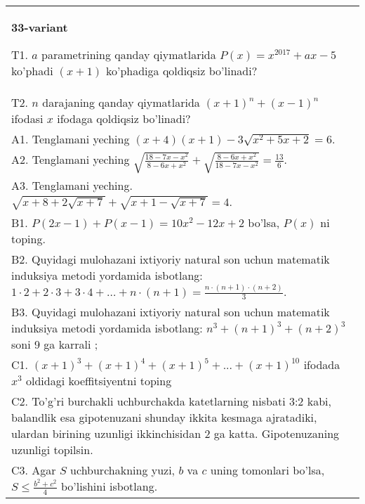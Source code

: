 \documentclass{article}
\begin{document}
\begin{tabular}{m{17cm}}
\textbf{33-variant}
\newline

T1. \(a\) parametrining qanday qiymatlarida \(P(x) = x^{2017} + ax - 5\) ko'phadi \((x + 1)\) ko'phadiga qoldiqsiz bo'linadi? \\
T2. \(n\) darajaning qanday qiymatlarida \((x + 1)^{n} + (x - 1)^{n}\) ifodasi \(x\) ifodaga qoldiqsiz bo'linadi? \\
A1. Tenglamani yeching \((x + 4)(x + 1) - 3\sqrt{x^{2} + 5x + 2} = 6\). \\
A2. Tenglamani yeching \(\sqrt{\frac{18 - 7x - x^{2}}{8 - 6x + x^{2}}} + \sqrt{\frac{8 - 6x + x^{2}}{18 - 7x - x^{2}}} = \frac{13}{6}\). \\
A3. Tenglamani yeching. \(\sqrt{x + 8 + 2\sqrt{x + 7}} + \sqrt{x + 1 - \sqrt{x + 7}} = 4\). \\
B1. \(P(2x - 1) + P(x - 1) = 10x^{2} - 12x + 2\) bo'lsa, \(P(x)\) ni toping. \\
B2. Quyidagi mulohazani ixtiyoriy natural son uchun matematik induksiya metodi yordamida isbotlang: \(1 \cdot 2 + 2 \cdot 3 + 3 \cdot 4 + \ldots + n \cdot (n + 1) = \frac{n \cdot (n + 1) \cdot (n + 2)}{3}\). \\
B3. Quyidagi mulohazani ixtiyoriy natural son uchun matematik induksiya metodi yordamida isbotlang: \(n^{3} + (n + 1)^{3} + (n + 2)^{3}\) soni 9 ga karrali ; \\
C1. \((x + 1)^{3} + (x + 1)^{4} + (x + 1)^{5} + ... + (x + 1)^{10}\) ifodada \(x^{3}\) oldidagi koeffitsiyentni toping \\
C2. To'g'ri burchakli uchburchakda katetlarning nisbati 3:2 kabi, balandlik esa gipotenuzani shunday ikkita kesmaga ajratadiki, ulardan birining uzunligi ikkinchisidan 2 ga katta. Gipotenuzaning uzunligi topilsin. \\
C3. Agar \(S\) uchburchakning yuzi, \(b\) va \(c\) uning tomonlari bo'lsa, \(S \leq \frac{b^{2} + c^{2}}{4}\) bo'lishini isbotlang. \\

\end{tabular}
\vspace{1cm}
\end{document}
